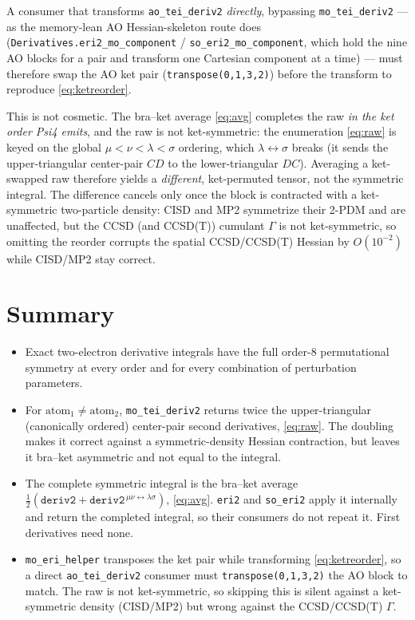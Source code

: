 \documentclass[11pt]{article}
\begin{document}
A consumer that transforms \texttt{ao\_tei\_deriv2} \emph{directly}, bypassing
\texttt{mo\_tei\_deriv2} --- as the memory-lean AO Hessian-skeleton route does
(\texttt{Derivatives.eri2\_mo\_component} / \texttt{so\_eri2\_mo\_component}, which
hold the nine AO blocks for a pair and transform one Cartesian component at a
time) --- must therefore swap the AO ket pair (\texttt{transpose(0,1,3,2)}) before
the transform to reproduce \eqref{eq:ketreorder}.

This is not cosmetic. The bra--ket average \eqref{eq:avg} completes the raw
\emph{in the ket order Psi4 emits}, and the raw is not ket-symmetric: the
enumeration \eqref{eq:raw} is keyed on the global $\mu<\nu<\lambda<\sigma$
ordering, which $\lambda\leftrightarrow\sigma$ breaks (it sends the
upper-triangular center-pair $CD$ to the lower-triangular $DC$). Averaging a
ket-swapped raw therefore yields a \emph{different}, ket-permuted tensor, not the
symmetric integral. The difference cancels only once the block is contracted with
a ket-symmetric two-particle density: CISD and MP2 symmetrize their 2-PDM and are
unaffected, but the CCSD (and CCSD(T)) cumulant $\Gamma$ is not ket-symmetric, so
omitting the reorder corrupts the spatial CCSD/CCSD(T) Hessian by $O(10^{-2})$
while CISD/MP2 stay correct.

\section{Summary}

\begin{itemize}
\item Exact two-electron derivative integrals have the full order-8 permutational
symmetry at every order and for every combination of perturbation parameters.
\item For $\mathrm{atom}_1\neq\mathrm{atom}_2$, \texttt{mo\_tei\_deriv2} returns
twice the upper-triangular (canonically ordered) center-pair second derivatives,
\eqref{eq:raw}. The doubling makes it correct against a symmetric-density Hessian
contraction, but leaves it bra--ket asymmetric and not equal to the integral.
\item The complete symmetric integral is the bra--ket average
$\tfrac12(\texttt{deriv2}+\texttt{deriv2}^{\,\mu\nu\leftrightarrow\lambda\sigma})$,
\eqref{eq:avg}. \texttt{eri2} and \texttt{so\_eri2} apply it internally and return
the completed integral, so their consumers do not repeat it. First derivatives
need none.
\item \texttt{mo\_eri\_helper} transposes the ket pair while transforming
\eqref{eq:ketreorder}, so a direct \texttt{ao\_tei\_deriv2} consumer must
\texttt{transpose(0,1,3,2)} the AO block to match. The raw is not ket-symmetric,
so skipping this is silent against a ket-symmetric density (CISD/MP2) but wrong
against the CCSD/CCSD(T) $\Gamma$.
\end{itemize}
\end{document}
